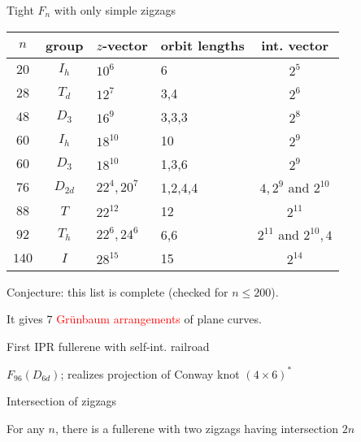 \documentclass[%
pdf,
colorBG,
slideColor,
]{prosper}
\begin{document}
\begin{slide}{Tight $F_n$ with only simple zigzags}
{\scriptsize
\begin{center}
\begin{tabular}{||c|c|l|l|c||}
\hline
\hline
$n$       &group          &$z$-vector     &orbit lengths  &int. vector\\
\hline \hline
$20$    &$I_h$          &$10^6$         &6              &$2^5$ \\
$28$    &$T_d$          &$12^7$         &3,4            &$2^6$\\
$48$    &$D_3$          &$16^9$         &3,3,3          &$2^8$\\
$60$    &$I_h$          &$18^{10}$      &10             &$2^9$\\
$60$    &$D_3$          &$18^{10}$      &1,3,6          &$2^9$\\
$76$    &$D_{2d}$       &$22^4,20^7$    &1,2,4,4        &$4,2^9$ and $2^{10}$\\
$88$    &$T$            &$22^{12}$      &12             &$2^{11}$\\
$92$    &$T_h$          &$22^6, 24^6$   &6,6            &$2^{11}$ and $2^{10}, 4$\\
$140$   &$I$            &$28^{15}$      &15             &$2^{14}$\\
\hline
\hline
\end{tabular}
\end{center}
}
Conjecture: this list is complete (checked for $n\leq 200$).

It gives $7$ \textcolor{red}{Gr\"unbaum arrangements} of plane curves.

\end{slide}



\begin{slide}{First IPR fullerene with self-int. railroad}
\vspace{-4mm}
\begin{center}
\centering
{}\par
\end{center}
\begin{center}
$F_{96}(D_{6d})$; realizes projection of Conway knot $(4 \times 6)^{*}$
\end{center}
\end{slide}


\begin{slide}{Intersection of zigzags}
\vspace{-5mm}
\begin{center}
\end{center}
\begin{center}
For any $n$, there is a fullerene with two zigzags having intersection $2n$
\end{center}
\end{slide}
\end{document}
